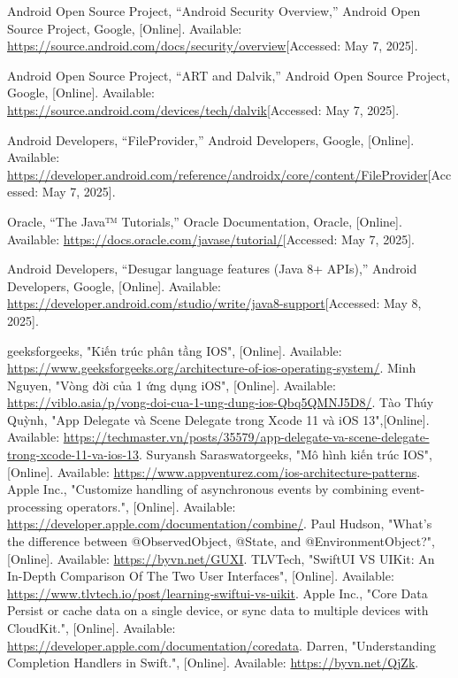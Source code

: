 \documentclass[12pt]{report}
\begin{document}
\begin{thebibliography}{1}
  Android Open Source Project, “Android Security Overview,” Android Open Source Project, Google, [Online]. Available: \url{https://source.android.com/docs/security/overview}[Accessed: May 7, 2025].
 
  Android Open Source Project, “ART and Dalvik,” Android Open Source Project, Google, [Online]. Available: \url{https://source.android.com/devices/tech/dalvik}[Accessed: May 7, 2025].
 
  Android Developers, “FileProvider,” Android Developers, Google, [Online]. Available: \url{https://developer.android.com/reference/androidx/core/content/FileProvider}[Accessed: May 7, 2025].
 
  Oracle, “The Java™ Tutorials,” Oracle Documentation, Oracle, [Online]. Available: \url{https://docs.oracle.com/javase/tutorial/}[Accessed: May 7, 2025].
 
  Android Developers, “Desugar language features (Java 8+ APIs),” Android Developers, Google, [Online]. Available: \url{https://developer.android.com/studio/write/java8-support}[Accessed: May 8, 2025].
 
  
 geeksforgeeks, "Kiến trúc phân tầng IOS", [Online]. Available: \url{https://www.geeksforgeeks.org/architecture-of-ios-operating-system/}.
  Minh Nguyen, "Vòng đời của 1 ứng dụng iOS", [Online]. Available: \url{https://viblo.asia/p/vong-doi-cua-1-ung-dung-ios-Qbq5QMNJ5D8/}.
Tào Thúy Quỳnh, "App Delegate và Scene Delegate trong Xcode 11 và iOS 13",[Online]. Available: \url{https://techmaster.vn/posts/35579/app-delegate-va-scene-delegate-trong-xcode-11-va-ios-13}.
Suryansh Saraswatorgeeks, "Mô hình kiến trúc IOS", [Online]. Available: \url{https://www.appventurez.com/ios-architecture-patterns}.
Apple Inc., "Customize handling of asynchronous events by combining event-processing operators.", [Online]. Available: \url{https://developer.apple.com/documentation/combine/}.
 Paul Hudson, "What’s the difference between @ObservedObject, @State, and @EnvironmentObject?", [Online]. Available: \url{https://byvn.net/GUXI}.
 TLVTech, "SwiftUI VS UIKit: An In-Depth Comparison Of The Two User Interfaces", [Online]. Available: \url{https://www.tlvtech.io/post/learning-swiftui-vs-uikit}.
 Apple Inc., "Core Data Persist or cache data on a single device, or sync data to multiple devices with CloudKit.", [Online]. Available: \url{https://developer.apple.com/documentation/coredata}.
 Darren, "Understanding Completion Handlers in Swift.", [Online]. Available: \url{https://byvn.net/QjZk}.


\end{thebibliography}
\end{document}
